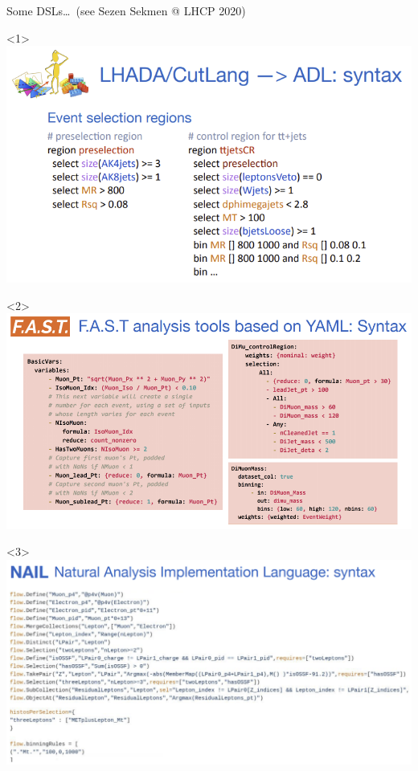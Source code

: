 \documentclass[aspectratio=169]{beamer}
\begin{document}
\begin{frame}{Some DSLs\ldots\ (see Sezen Sekmen @ LHCP 2020)}
\vspace{0.25 cm}
\begin{center}
\begin{onlyenv}<1>
\vspace{-0.25 cm}
\includegraphics[width=0.8\linewidth]{img/adl-1.png}
\end{onlyenv}
\begin{onlyenv}<2>
\includegraphics[width=0.9\linewidth]{img/adl-2.png}
\end{onlyenv}
\begin{onlyenv}<3>
\includegraphics[width=1.0\linewidth]{img/adl-3.png}

\end{onlyenv}
\end{center}
\end{frame}
\end{document}
